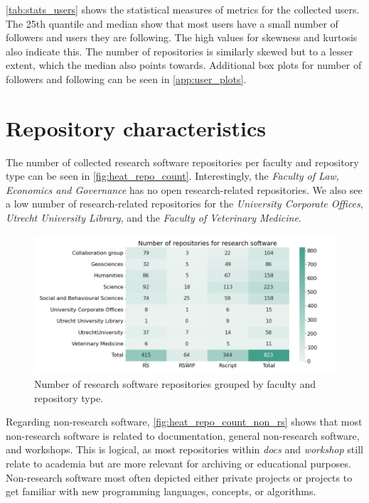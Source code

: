 \newpage

\autoref{tab:stats_users} shows the statistical measures of metrics for the collected users. The 25th quantile and median show that most users have a small number of followers and users they are following. The high values for skewness and kurtosis also indicate this. The number of repositories is similarly skewed but to a lesser extent, which the median also points towards. Additional box plots for number of followers and following can be seen in \autoref{app:user_plots}.






\section{Repository characteristics}
\label{sec:res_repos}
The number of collected research software repositories per faculty and repository type can be seen in \autoref{fig:heat_repo_count}. Interestingly, the \textit{Faculty of Law, Economics and Governance} has no open research-related repositories. We also see a low number of research-related repositories for the \textit{University Corporate Offices}, \textit{Utrecht University Library}, and the \textit{Faculty of Veterinary Medicine}.


\begin{figure}[h!]
\centerline{
\includegraphics[scale=0.45]{figures_results/heatmap_repo_count.png}}
\vspace{-0.3cm}
\caption{Number of research software repositories grouped by faculty and repository type.
\label{fig:heat_repo_count}}
\end{figure}

Regarding non-research software, \autoref{fig:heat_repo_count_non_rs} shows that most non-research software is related to documentation, general non-research software, and workshops. This is logical, as most repositories within \textit{docs} and \textit{workshop} still relate to academia but are more relevant for archiving or educational purposes. Non-research software most often depicted either private projects or projects to get familiar with new programming languages, concepts, or algorithms.

